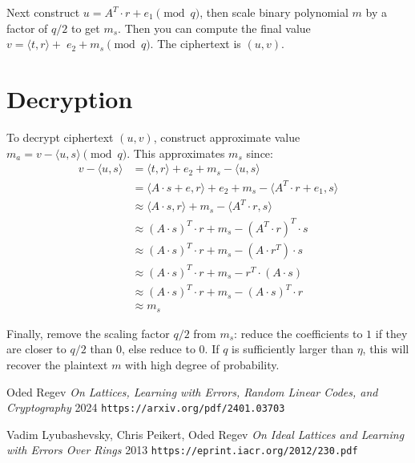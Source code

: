 \documentclass{article}
\begin{document}
Next construct $u = A^T \cdot r + e_1 \pmod{q}$, then scale binary polynomial $m$ by a factor of $q/2$ to get $m_s$.  Then you can compute the final value $v = \langle t, r \rangle +\;e_2 + m_s \pmod{q}$.  The ciphertext is $(u, v)$.

\section{
  Decryption
}

To decrypt ciphertext $(u, v)$, construct approximate value $m_a = v - \langle u, s \rangle \pmod{q}$.  This approximates $m_s$ since:
\begin{align}
  v - \langle u, s \rangle &= \langle t, r \rangle + e_2 + m_s - \langle u, s \rangle\nonumber\\
  &= \langle A \cdot s + e, r \rangle + e_2 + m_s - \langle A^T \cdot r + e_1, s \rangle\nonumber\\
  &\approx \langle A \cdot s, r \rangle + m_s - \langle A^T \cdot r, s \rangle\nonumber\\
  &\approx (A \cdot s)^T \cdot r + m_s - (A^T \cdot r)^T \cdot s\nonumber\\
  &\approx (A \cdot s)^T \cdot r + m_s - (A \cdot r^T) \cdot s\nonumber\\
  &\approx (A \cdot s)^T \cdot r + m_s - r^T \cdot (A \cdot s)\nonumber\\
  &\approx (A \cdot s)^T \cdot r + m_s - (A \cdot s)^T \cdot r\nonumber\\
  &\approx m_s
\end{align}

Finally, remove the scaling factor $q/2$ from $m_s$: reduce the coefficients to $1$ if they are closer to $q/2$ than $0$, else reduce to $0$.  If $q$ is sufficiently larger than $\eta$, this will recover the plaintext $m$ with high degree of probability.


\begin{thebibliography}{2}

  Oded Regev
  \emph{On Lattices, Learning with Errors, Random Linear Codes, and Cryptography} 2024
  \texttt{https://arxiv.org/pdf/2401.03703}

  Vadim Lyubashevsky, Chris Peikert, Oded Regev
  \emph{On Ideal Lattices and Learning with Errors Over Rings} 2013
  \texttt{https://eprint.iacr.org/2012/230.pdf}
  
\end{thebibliography}
\end{document}
